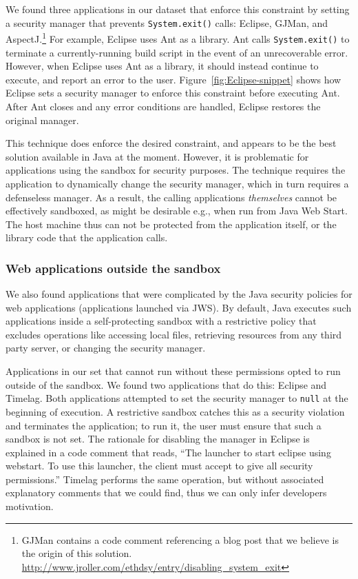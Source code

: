\documentclass{sig-alternate}
\begin{document}
We found three applications in our dataset that 
enforce this constraint by setting a security manager
that prevents \texttt{System.exit()} calls:
Eclipse, GJMan, and AspectJ.\footnote{%
GJMan contains a code comment referencing a
blog post that we believe is the origin of this solution. \url{http://www.jroller.com/ethdsy/entry/disabling_system_exit}}
For example, Eclipse uses Ant as a library.  Ant calls \texttt{System.exit()} to
terminate a currently-running build script in the event of an unrecoverable
error.  However, when Eclipse uses Ant as a library, it
should instead continue to execute, and report an error to the user.
Figure~\ref{fig:Eclipse-snippet} shows
how Eclipse sets a security manager to enforce this constraint
before executing Ant. After Ant closes and any error conditions
are handled, Eclipse restores the original manager.

This technique does enforce the
desired constraint, and appears to be the best solution available
in Java at the moment.  However, it is problematic for applications using the
sandbox for security purposes.  The technique requires 
the application to dynamically change the security manager, which in turn requires a
defenseless manager.  As a result, the calling applications \emph{themselves} cannot be
effectively sandboxed, as might be desirable e.g., when run from Java Web Start.
The host machine thus can not be protected from the application itself, or the
library code that the application calls. 

\subsubsection{Web applications outside the sandbox}\label{sub:Reducing-Web-Application-Complexity}

We also found applications that were complicated by the Java security policies
for web applications (applications launched via JWS). By default,
Java executes such applications inside a self-protecting 
sandbox with a restrictive policy that excludes
operations like accessing local files, retrieving resources
from any third party server, or changing the security manager. 

Applications in our set that cannot run without these permissions
opted to run outside of the sandbox.  
We found two applications that do this: Eclipse and
Timelag.  Both applications attempted
to set the security manager to \texttt{null} at the beginning of execution.
A restrictive sandbox catches this as a security violation and terminates the
application; to run it, the user must ensure that such a sandbox is not set.
The rationale for disabling the manager in Eclipse is explained in a 
code comment that reads, ``The launcher to start eclipse using webstart. To use
this launcher, the client must accept to give all security permissions.'' Timelag
performs the same operation, but without associated explanatory comments that we
could find, thus we can only 
infer developers motivation. 
\end{document}

